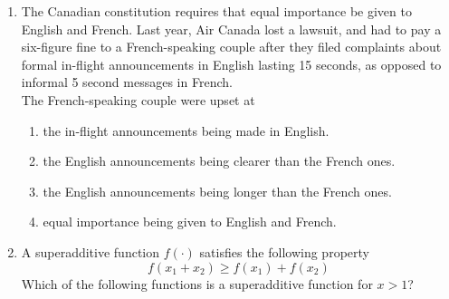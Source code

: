 \documentclass[a4paper, 11pt]{article}
\begin{document}
\begin{enumerate}
    \hfill{}

    \item The Canadian constitution requires that equal importance be given to English and French. Last year, Air Canada lost a lawsuit, and had to pay a six-figure fine to a French-speaking couple after they filed complaints about formal in-flight announcements in English lasting 15 seconds, as opposed to informal 5 second messages in French.\\The French-speaking couple were upset at
    \begin{enumerate}
        \item the in-flight announcements being made in English.
        \item the English announcements being clearer than the French ones.
        \item the English announcements being longer than the French ones.
        \item equal importance being given to English and French.
    \end{enumerate}

    \hfill{}

    \item A superadditive function $f(\cdot)$ satisfies the following property
    $$f(x_1+x_2) \ge f(x_1)+f(x_2)$$
    Which of the following functions is a superadditive function for $x>1$?
    \begin{enumerate}
    \end{enumerate}

    \hfill{}


\end{enumerate}
\end{document}
